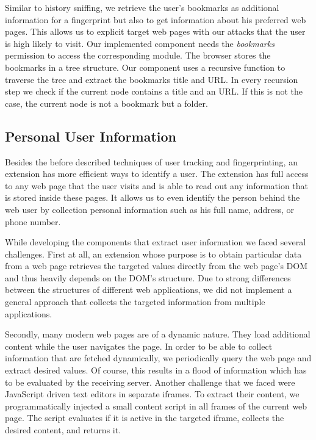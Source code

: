 	Similar to history sniffing, we retrieve the user's bookmarks as additional information for a fingerprint but also to get information about his preferred web pages. This allows us to explicit target web pages with our attacks that the user is high likely to visit. Our implemented component needs the \textit{bookmarks} permission to access the corresponding module. The browser stores the bookmarks in a tree structure. Our component uses a recursive function to traverse the tree and extract the bookmarks title and URL. In every recursion step we check if the current node contains a title and an URL. If this is not the case, the current node is not a bookmark but a folder.

\subsection{Personal User Information}
\label{sec:personalUserInformation}
	
	Besides the before described techniques of user tracking and fingerprinting, an extension has more efficient ways to identify a user. The extension has full access to any web page that the user visits and is able to read out any information that is stored inside these pages. It allows us to even identify the person behind the web user by collection personal information such as his full name, address, or phone number. 
	
	While developing the components that extract user information we faced several challenges. First at all, an extension whose purpose is to obtain particular data from a web page retrieves the targeted values directly from the web page's DOM and thus heavily depends on the DOM's structure. Due to strong differences between the structures of different web applications, we did not implement a general approach that collects the targeted information from multiple applications. 
	
	Secondly, many modern web pages are of a dynamic nature. They load additional content while the user navigates the page. In order to be able to collect information that are fetched dynamically, we periodically query the web page and extract desired values. Of course, this results in a flood of information which has to be evaluated by the receiving server. Another challenge that we faced were JavaScript driven text editors in separate iframes. To extract their content, we programmatically injected a small content script in all frames of the current web page. The script evaluates if it is active in the targeted iframe, collects the desired content, and returns it. 
	
